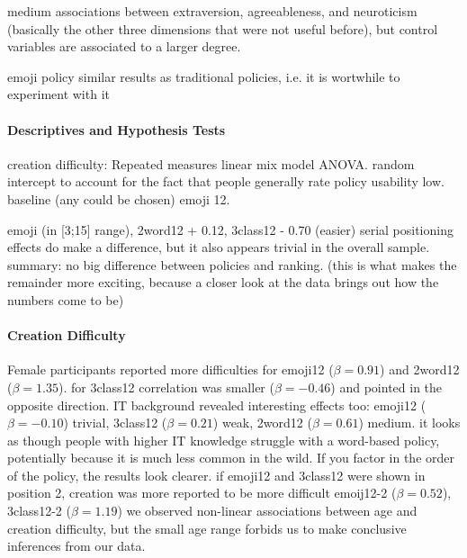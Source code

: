 

medium associations between extraversion, agreeableness, and neuroticism (basically the other three dimensions that were not useful before), but control variables are associated to a larger degree.

emoji policy similar results as traditional policies, i.e. it is wortwhile to experiment with it

\paragraph{Descriptives and Hypothesis Tests}
creation difficulty: Repeated measures linear mix model ANOVA. random intercept to account for the fact that people generally rate policy usability low. baseline (any could be chosen) emoji 12.

emoji  (in [3;15] range), 2word12 + 0.12, 3class12 - 0.70 (easier)
serial positioning effects do make a difference, but it also appears trivial in the overall sample.
summary: no big difference between policies and ranking. (this is what makes the remainder more exciting, because a closer look at the data brings out how the numbers come to be)


\paragraph{Creation Difficulty}
Female participants reported more difficulties for emoji12 ($\beta=0.91$) and 2word12 ($\beta=1.35$). 
for 3class12 correlation was smaller ($\beta=-0.46$) and pointed in the opposite direction.
IT background revealed interesting effects too: emoji12 ($\beta=-0.10$) trivial, 3class12 ($\beta=0.21$) weak, 2word12 ($\beta=0.61$) medium. it looks as though people with higher IT knowledge struggle with a word-based policy, potentially because it is much less common in the wild. 
If you factor in the order of the policy, the results look clearer. if emoji12 and 3class12 were shown in position 2, creation was more reported to be more difficult emoij12-2 ($\beta=0.52$), 3class12-2 ($\beta=1.19$) 
we observed non-linear associations between age and creation difficulty, but the small age range forbids us to make conclusive inferences from our data.


